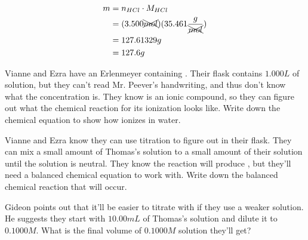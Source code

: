 \documentclass[11pt,addpoints]{exam}   	%
\begin{document}
\begin{questions}
\begin{solution}
\begin{equation} 
\begin{split}
    m &= n_{HCl} \cdot M_{HCl} \\
        &= (3.500 \xcancel{mol}) (35.461 \frac{g}{\xcancel{mol}}) \\
        &= 127.61329 g \\
        &= 127.6 g
 \end{split}
 \end{equation}
\end{solution}

\vspace{0.2in}

\question[5] Vianne and Ezra have an Erlenmeyer containing . Their flask contains $1.000 L$ of  solution, but they can't read Mr. Peever's handwriting, and thus don't know what the concentration is. They know  is an ionic compound, so they can figure out what the chemical reaction for its ionization looks like.
 Write down the chemical equation to show how  ionizes in water.

\begin{solution}
\end{solution}

\vspace{0.2in}

\question[5] Vianne and Ezra know they can use titration to figure out \ce{[NaOH]} in their flask. They can mix a small amount of Thomas's  solution to a small amount of their  solution until the solution is neutral. They know the reaction will produce , but they'll need a balanced chemical equation to work with.
Write down the balanced chemical reaction that will occur.

\begin{solution}
\end{solution}

\vspace{0.2in}

\clearpage
\question[5] Gideon points out that it'll be easier to titrate  with  if they use a weaker solution. He suggests they start with $10.00 mL$ of Thomas's solution and dilute it to $0.1000 M$.
What is the final volume of $0.1000 M$ solution they'll get?


\end{questions}
\end{document}
